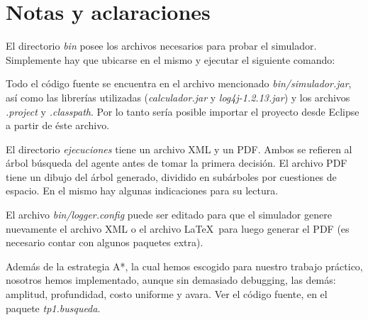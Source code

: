 \section{Notas y aclaraciones}

El directorio \emph{bin} posee los archivos necesarios para probar el
simulador.  Simplemente hay que ubicarse en el mismo y ejecutar el siguiente
comando: 

Todo el código fuente se encuentra en el archivo mencionado
\linebreak\emph{bin/simulador.jar}, así como las librerías utilizadas
(\emph{calculador.jar} y \linebreak\emph{log4j-1.2.13.jar}) y los archivos
\emph{.project} y \emph{.classpath}. Por lo tanto sería posible importar el
proyecto desde Eclipse a partir de éste archivo.

El directorio \emph{ejecuciones} tiene un archivo XML y un PDF. Ambos se
refieren al árbol búsqueda del agente antes de tomar la primera decisión. El
archivo PDF tiene un dibujo del árbol generado, dividido en subárboles por
cuestiones de espacio. En el mismo hay algunas indicaciones para su lectura.

El archivo \emph{bin/logger.config} puede ser editado para que el simulador
genere nuevamente el archivo XML o el archivo \LaTeX~para luego generar el PDF
(es necesario contar con algunos paquetes extra).

Además de la estrategia A*, la cual hemos escogido para nuestro trabajo
práctico, nosotros hemos implementado, aunque sin demasiado debugging, las
demás: amplitud, profundidad, costo uniforme y avara. Ver el código fuente, en
el paquete \emph{tp1.busqueda}.

